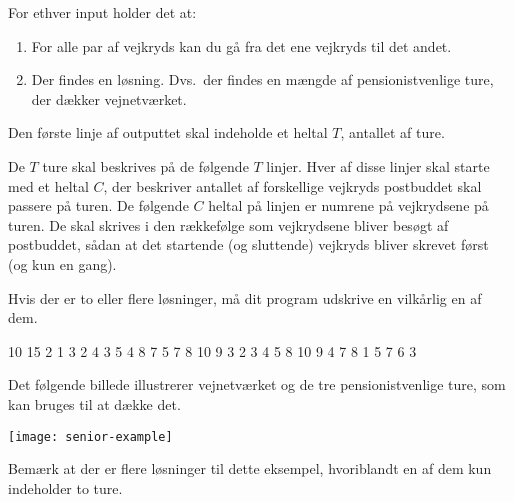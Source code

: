\documentclass{boi2014-dk}
\begin{document}
    For ethver input holder det at:

    \begin{enumerate}
        \item For alle par af vejkryds kan du gå fra det ene vejkryds til
            det andet.
        \item Der findes en løsning. Dvs.~der findes en mængde af
            pensionistvenlige ture, der dækker vejnetværket.
    \end{enumerate}

    \Output
    Den første linje af outputtet skal indeholde et heltal $T$, antallet
    af ture.

    De $T$ ture skal beskrives på de følgende $T$ linjer.
    Hver af disse linjer skal starte med et heltal $C$, der beskriver antallet
    af forskellige vejkryds postbuddet skal passere på turen.
    De følgende $C$ heltal på linjen er numrene på vejkrydsene på turen.
    De skal skrives i den rækkefølge som vejkrydsene bliver besøgt af
    postbuddet, sådan at det startende (og sluttende) vejkryds bliver
    skrevet først (og kun en gang).

    Hvis der er to eller flere løsninger, må dit program udskrive en vilkårlig
    en af dem.

    \Example

    \example
    {
        10 15  2  1 3  2 4  3 5  4 8  7  5 7  8  10  9
    }
    {
        3  2 3 4 5 8 10 9  4 7 8  1 5 7 6 3
    }
    {
        Det følgende billede illustrerer vejnetværket og de tre
        pensionistvenlige ture, som kan bruges til at dække det.

        \texttt{[image: senior-example]}

        Bemærk at der er flere løsninger til dette eksempel, hvoriblandt
        en af dem kun indeholder to ture.
    }
\end{document}
